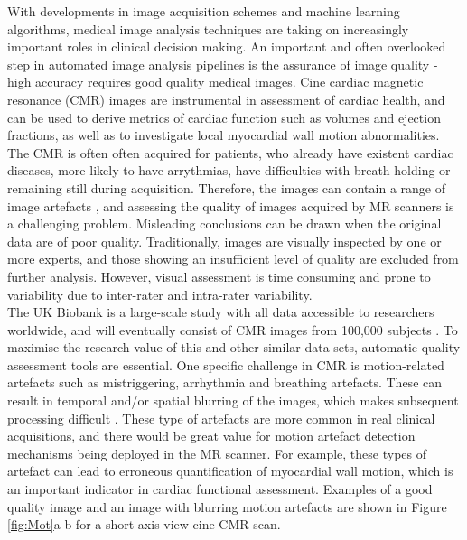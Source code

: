 \documentclass[preprint,12pt,authoryear]{elsarticle}
\begin{document}
With developments in image acquisition schemes and machine learning algorithms, medical image analysis techniques are taking on increasingly important roles in clinical decision making. 
An important and often overlooked step in automated image analysis pipelines is the assurance of image quality - high accuracy requires good quality medical images. Cine  cardiac magnetic resonance (CMR) images are instrumental in assessment of cardiac health, and can be used to derive metrics of cardiac function such as volumes and ejection fractions, as well as to investigate local myocardial wall motion abnormalities.  The CMR is often often acquired for patients, who already have existent cardiac diseases, more likely to have arrythmias, have difficulties with breath-holding  or remaining still during acquisition. Therefore, the images can contain a range of image artefacts \citep{Ferreira2013}, and assessing the quality of images acquired by MR scanners is a challenging problem. Misleading conclusions can be drawn when the original data are of poor quality. Traditionally, images are visually inspected by one or more experts, and those showing an insufficient level of quality are excluded from further analysis. However, visual assessment is time consuming and prone to variability due to inter-rater and intra-rater variability.\\

The UK Biobank is a large-scale study with all data accessible to researchers worldwide, and will eventually consist of CMR images from 100,000 subjects \citep{Petersen2015}. To maximise the research value of this and other similar data sets, automatic quality assessment tools are essential. One specific challenge in CMR is motion-related artefacts such as mistriggering, arrhythmia and breathing artefacts. These can result in temporal and/or spatial blurring of the images, which makes subsequent processing difficult \citep{Ferreira2013}. These type of artefacts are more common in real clinical acquisitions, and there would be great value for motion artefact detection mechanisms being deployed in the MR scanner.
For example, these types of artefact can lead to erroneous quantification of myocardial wall motion, which is an important indicator in cardiac functional assessment. Examples of a good quality image and an image with blurring motion artefacts are shown in Figure \ref{fig:Mot}a-b for a short-axis view cine CMR scan.\\ 

\end{document}
